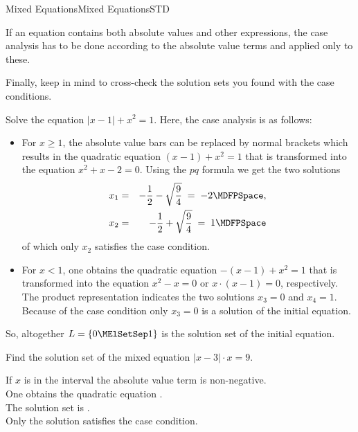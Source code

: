 \begin{MXContent}{Mixed Equations}{Mixed Equations}{STD}

\begin{MInfo}
If an equation contains both absolute values and other expressions, the case analysis 
has to be done according to the absolute value terms and applied only to these.
\end{MInfo}

Finally, keep in mind to cross-check the solution sets you found with the case conditions.

\begin{MExample}
Solve the equation $|x-1|+x^2=1$. Here, the case analysis is as follows:
\begin{itemize}
\item{For $x\geq 1$, the absolute value bars can be replaced by normal brackets which results
in the quadratic equation $(x-1)+x^2=1$ that is transformed into the equation $x^2+x-2=0$.
Using the $p q$ formula we get the two solutions
\begin{eqnarray*}
x_1 & =& -\Mdfrac12-\sqrt{\Mdfrac94}\;=\; -2 \MDFPSpace, \\
x_2 & =& -\Mdfrac12+\sqrt{\Mdfrac94}\;=\; 1 \MDFPSpace
\end{eqnarray*}
of which only $x_2$ satisfies the case condition.
}
\item{For $x<1$, one obtains the quadratic equation $-(x-1)+x^2=1$ that is 
transformed into the equation $x^2-x=0$ or $x\cdot (x-1)=0$, respectively. The product representation 
indicates the two solutions $x_3=0$ and $x_4=1$. Because of the case condition only 
$x_3=0$ is a solution of the initial equation.
}
\end{itemize}
So, altogether $\ML=\lbrace 0\MElSetSep 1\rbrace$ is the solution set of the 
initial equation.
\end{MExample}

\begin{MExercise}
Find the solution set of the mixed equation $|x-3|\cdot x=9$.
\begin{MExerciseItems}
\item{If $x$ is in the interval \MLIntervalQuestion{14}{[3,infty)}{5}{GIM1} the  
absolute value term is non-negative.\\ One obtains the quadratic equation 
.\\
The solution set is .\\
Only the solution  satisfies the case condition.}


\end{MExerciseItems}
\end{MExercise}
\end{MXContent}

